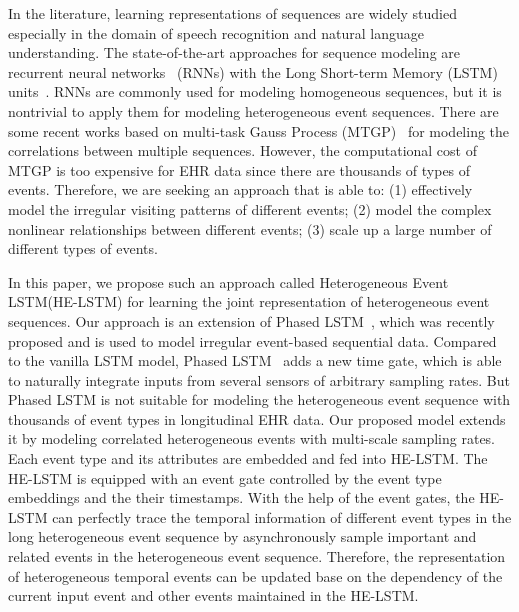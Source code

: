 \documentclass[letterpaper]{article} %
\begin{document}
In the literature, learning representations of sequences are widely studied especially in the domain of speech recognition and natural language understanding. The state-of-the-art approaches for sequence modeling are recurrent neural networks~\cite{mikolov2010recurrent} (RNNs) with the Long Short-term Memory (LSTM) units~\cite{hochreiter1997long}. RNNs are commonly used for modeling homogeneous sequences, but it is nontrivial to apply them for modeling heterogeneous event sequences. There are some recent works based on multi-task Gauss Process (MTGP)~\cite{ghassemi2015multivariate} for modeling the correlations between multiple sequences. However, the computational cost of MTGP is too expensive for EHR data since there are thousands of types of events. Therefore, we are seeking an approach that is able to: (1) effectively model the irregular visiting patterns of different events; (2) model the complex nonlinear relationships between different events; (3) scale up a large number of different types of events.













In this paper, we propose such an approach called Heterogeneous Event LSTM(HE-LSTM) for learning the joint representation of heterogeneous event sequences. Our approach is an extension of Phased LSTM~\cite{neil2016phased}, which was recently proposed and is used to model irregular event-based sequential data. Compared to the vanilla LSTM model, Phased LSTM~\cite{neil2016phased}  adds a new time gate, which is able to naturally integrate inputs from several sensors of arbitrary sampling rates. But Phased LSTM is not suitable for modeling the heterogeneous event sequence with thousands of event types in longitudinal EHR data. Our proposed model extends it by modeling correlated heterogeneous events with multi-scale sampling rates.
Each event type and its attributes are embedded and fed into HE-LSTM. The HE-LSTM is equipped with an event gate controlled by the event type embeddings and the their timestamps.
With the help of the event gates, the HE-LSTM can perfectly trace the temporal information of different event types in the long heterogeneous event sequence
by asynchronously sample important and related events in the heterogeneous event sequence.
Therefore, the representation of heterogeneous temporal events can be updated base on the dependency of the current input event and other events maintained in the HE-LSTM.
\end{document}
